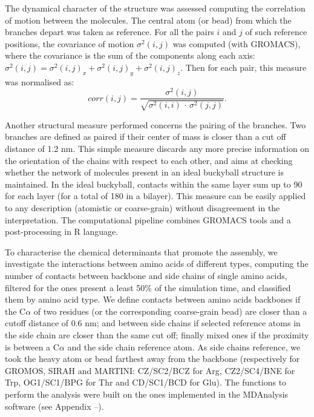 The dynamical character of the structure was assessed computing the correlation of motion between the molecules. The central atom (or bead) from which the branches depart was taken as reference. For all the pairs $i$ and $j$ of such reference positions, the covariance of motion $\sigma^2(i,j)$ was computed (with GROMACS), where the covariance is the sum of the components along each axis: $\sigma^2(i,j) = \sigma^2(i,j)_x + \sigma^2(i,j)_y + \sigma^2(i,j)_z$. Then for each pair, this measure was normalised as:
\begin{equation}
corr(i,j) = \frac{\sigma^2(i,j)}{\sqrt{\sigma^2(i,i)\,\cdot\,\sigma^2(j,j)}}.
\end{equation}

Another structural measure performed concerns the pairing of the branches. Two branches are defined as paired if their center of mass is closer than a cut off distance of 1.2 nm. This simple measure discards any more precise information on the orientation of the chains with respect to each other, and aims at checking whether the network of molecules present in an ideal buckyball structure is maintained. In the ideal buckyball, contacts within the same layer sum up to 90 for each layer (for a total of 180 in a bilayer). This measure can be easily applied to any description (atomistic or coarse-grain) without disagreement in the interpretation. The computational pipeline combines GROMACS tools and a post-processing in R language.

To characterise the chemical determinants that promote the assembly, we investigate the interactions between amino acids of different types, computing the number of contacts between backbone and side chains of single amino acids, filtered for the ones present a least 50\% of the simulation time, and classified them by amino acid type.
%
We define contacts between amino acids backbones if the C$\alpha$ of two residues (or the corresponding coarse-grain bead) are closer than a cutoff distance of 0.6 nm; and between side chains if selected reference atoms in the side chain are closer than the same cut off; finally mixed ones if the proximity is between a C$\alpha$ and the side chain reference atom. As side chains reference, we took the heavy atom or bead farthest away from the backbone (respectively for GROMOS, SIRAH and MARTINI: CZ/SC2/BCZ for Arg, CZ2/SC4/BNE for Trp, OG1/SC1/BPG for Thr and CD/SC1/BCD for Glu). The functions to perform the analysis were built on the ones implemented in the MDAnalysis software (see Appendix --).

